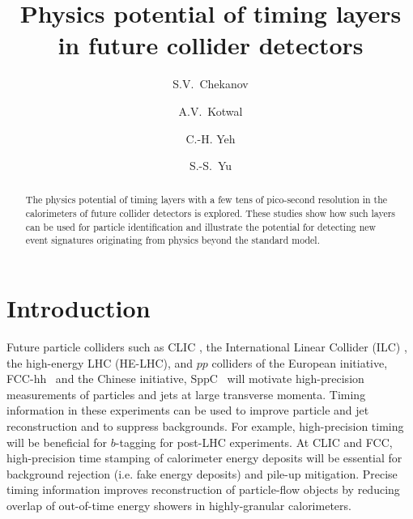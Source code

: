 \documentclass[final,1p,11pt]{elsarticle}
\begin{document}
\begin{frontmatter}

\title{
Physics potential of timing layers in future collider detectors}

\author[add1]{S.V.~Chekanov}

\author[addDuke]{A.V.~Kotwal}

\author[add3]{C.-H. Yeh}


\author[add3]{S.-S.~Yu}

\address[add1]{
HEP Division, Argonne National Laboratory,
9700 S.~Cass Avenue,
Argonne, IL 60439, USA.
}


\address[add3]{
Department of Physics and Center for High Energy and High Field Physics, 
National Central University, Chung-Li, Taoyuan City 32001, Taiwan
}

\address[addDuke]{
Department of Physics, Duke University, USA
}


\begin{abstract}
The physics potential of timing layers with a few tens of pico-second resolution in the 
calorimeters of future collider detectors is explored.
These studies show how such layers can be used for particle identification and  illustrate the potential for detecting  
new event signatures originating from physics beyond the standard model. 
\end{abstract}

\begin{keyword}

\end{keyword}
\end{frontmatter}



\section{Introduction}

Future particle colliders such as CLIC \cite{Linssen:1425915}, the International Linear Collider (ILC) \cite{Behnke:2013xla}, the high-energy LHC (HE-LHC),
and $pp$ colliders of the European initiative, FCC-hh~\cite{Benedikt:2206376} and the Chinese initiative, SppC~\cite{Tang:2015qga} 
will motivate  high-precision measurements of particles and jets 
at large transverse momenta. 
Timing information in these experiments  can be used to improve particle and jet reconstruction and to suppress backgrounds.
For example, high-precision timing will be beneficial for $b$-tagging for  post-LHC experiments. 
At CLIC and FCC, high-precision time stamping of calorimeter energy deposits will be essential for
background rejection (i.e. fake energy deposits) and pile-up mitigation.
Precise timing information improves reconstruction of particle-flow objects by reducing overlap 
of out-of-time energy showers in highly-granular calorimeters.
\end{document}

